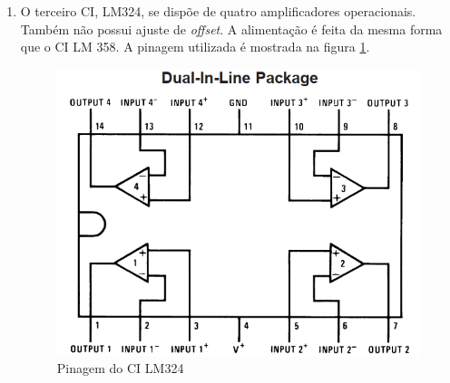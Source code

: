 \begin{enumerate}
    \item O terceiro CI, LM324, se dispõe de quatro amplificadores operacionais. Também não possui ajuste de \emph{offset}. A alimentação é feita da mesma forma que o CI LM 358. A pinagem utilizada é mostrada na figura \ref{fig:lm324}.
    \begin{figure}[H]
        \centering
        \includegraphics[width=.4\linewidth]{imagens/LM324.png}
        \caption{Pinagem do CI LM324}
        \label{fig:lm324}
    \end{figure}
\end{enumerate}
